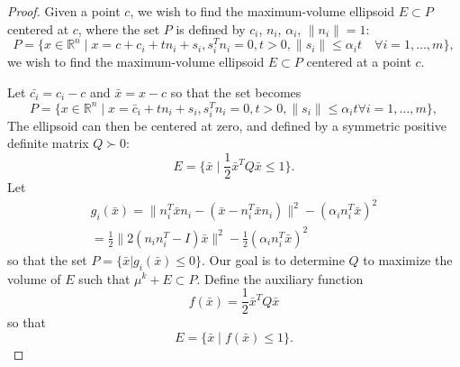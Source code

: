 \begin{theorem}
\end{theorem}

\begin{proof}
Given a point $c$, we wish to find the maximum-volume ellipsoid  $E \subset P$ centered at $c$, where the set $P$ is defined by $c_i$, $n_i$, $\alpha_i$, $\|n_i\| = 1$:
\[
P = \{ x \in \mathbb R^n \; | \;  x = c + c_i + tn_i + s_i, s_i^Tn_i = 0, t>0, \|s_i\| \le \alpha_i t \quad \forall i = 1,\ldots,m\},
\]
we wish to find the maximum-volume ellipsoid $E \subset P$ centered at a point $c$.


Let $\bar{c_i} = c_i - c$ and $\bar x = x - c$ so that the set becomes
\[
P = \{ x \in \mathbb R^n \; | \;  x = \bar c_i + tn_i + s_i, s_i^Tn_i = 0, t>0, \|s_i\| \le \alpha_i t \forall i = 1,\ldots,m\},
\]
The ellipsoid can then be centered at zero, and defined by a symmetric positive definite matrix $Q \succ 0$:
\[
E = \{ \bar x \; | \; \frac 1 2 \bar x^T Q \bar x \le 1 \}.
\]
Let 
\begin{align*}
g_i(\bar x) = \|n_i^T\bar xn_i - (\bar x - n_i^T\bar xn_i)\|^2 - (\alpha_i n_i^T\bar x)^2 \\
= \frac 1 2 \|2(n_in_i^T - I)\bar x\|^2 - \frac 1 2 (\alpha_i n_i^T\bar x)^2
\end{align*}
so that the set $P = \{\bar x | g_i(\bar x) \le 0\}$.
Our goal is to determine $Q$ to maximize the volume of $E$ such that $\mu^{k} + E \subset P$.
Define the auxiliary function 
\[
f(\bar x) = \frac 1 2 \bar x^T Q \bar x
\]
so that 
\[
E = \{ \bar x \; | \; f(\bar x) \le 1 \}.
\]


\end{proof}
